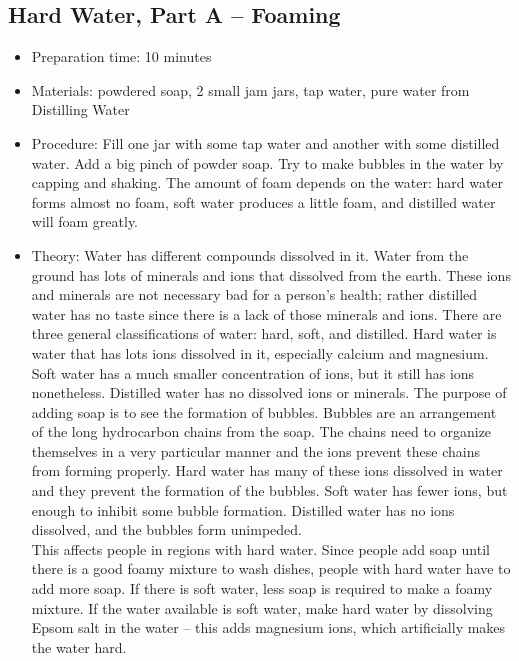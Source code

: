 \subsection{Hard Water, Part A -- Foaming}
\begin{itemize}
\item{Preparation time: 10 minutes}
\item{Materials: powdered soap, 2 small jam jars, tap water, pure water from Distilling Water}
\item{Procedure: Fill one jar with some tap water and another with some distilled water. Add a big pinch of powder soap. Try to make bubbles in the water by capping and shaking. The amount of foam depends on the water: hard water forms almost no foam, soft water produces a little foam, and distilled water will foam greatly.}
\item{Theory: Water has different compounds dissolved in it. Water from the ground has lots of minerals and ions that dissolved from the earth. These ions and minerals are not necessary bad for a person’s health; rather distilled water has no taste since there is a lack of those minerals and ions. There are three general classifications of water: hard, soft, and distilled. Hard water is water that has lots ions dissolved in it, especially calcium and magnesium. Soft water has a much smaller concentration of ions, but it still has ions nonetheless. Distilled water has no dissolved ions or minerals. The purpose of adding soap is to see the formation of bubbles. Bubbles are an arrangement of the long hydrocarbon chains from the soap. The chains need to organize themselves in a very particular manner and the ions prevent these chains from forming properly. Hard water has many of these ions dissolved in water and they prevent the formation of the bubbles. Soft water has fewer ions, but enough to inhibit some bubble formation. Distilled water has no ions dissolved, and the bubbles form unimpeded.\\
This affects people in regions with hard water. Since people add soap until there is a good foamy mixture to wash dishes, people with hard water have to add more soap. If there is soft water, less soap is required to make a foamy mixture. If the water available is soft water, make hard water by dissolving Epsom salt in the water -- this adds magnesium ions, which artificially makes the water hard.}
\end{itemize}

